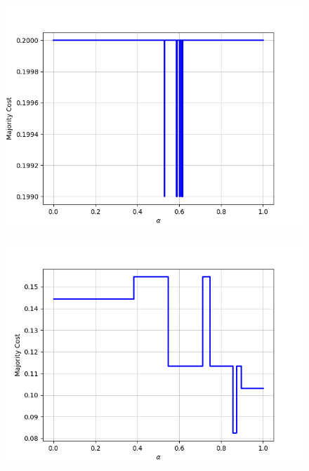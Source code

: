 \begin{figure}[h]
\centering
\begin{minipage}{.24\textwidth}
  \centering
  {\includegraphics[width=\linewidth]{plots/nell-sc/animal}}
\end{minipage}
\begin{minipage}{.24\textwidth}
  \centering
  {\includegraphics[width=\linewidth]{plots/nell-sc/arthropod}}
\end{minipage}
\begin{minipage}{.24\textwidth}
  \centering

\end{minipage}
\end{figure}
